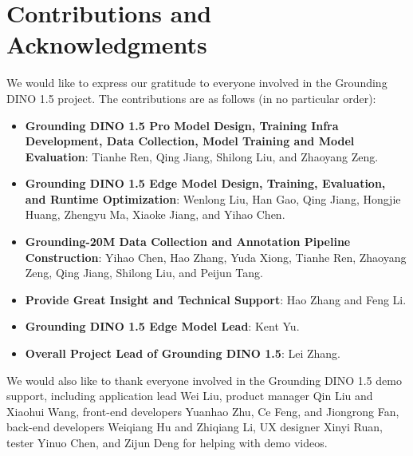 \section{Contributions and Acknowledgments}
We would like to express our gratitude to everyone involved in the Grounding DINO 1.5 project. The contributions are as follows (in no particular order):

\vspace{-5pt}
\begin{itemize}[leftmargin=*]
    \item \textbf{Grounding DINO 1.5 Pro Model Design, Training Infra Development, Data Collection, Model Training and Model Evaluation}: Tianhe Ren, Qing Jiang, Shilong Liu, and Zhaoyang Zeng.
    \item \textbf{Grounding DINO 1.5 Edge Model Design, Training, Evaluation, and Runtime Optimization}: Wenlong Liu, Han Gao, Qing Jiang, Hongjie Huang, Zhengyu Ma, Xiaoke Jiang, and Yihao Chen.
    \item  \textbf{Grounding-20M Data Collection and Annotation Pipeline Construction}: Yihao Chen, Hao Zhang, Yuda Xiong, Tianhe Ren, Zhaoyang Zeng, Qing Jiang, Shilong Liu, and Peijun Tang.
    \item \textbf{Provide Great Insight and Technical Support}: Hao Zhang and Feng Li.
    \item \textbf{Grounding DINO 1.5 Edge Model Lead}: Kent Yu.
    \item \textbf{Overall Project Lead of Grounding DINO 1.5}: Lei Zhang.
\end{itemize}

We would also like to thank everyone involved in the Grounding DINO 1.5 demo support, including application lead Wei Liu, product manager Qin Liu and Xiaohui Wang, front-end developers Yuanhao Zhu, Ce Feng, and Jiongrong Fan, back-end developers Weiqiang Hu and Zhiqiang Li, UX designer Xinyi Ruan, tester Yinuo Chen, and Zijun Deng for helping with demo videos.
